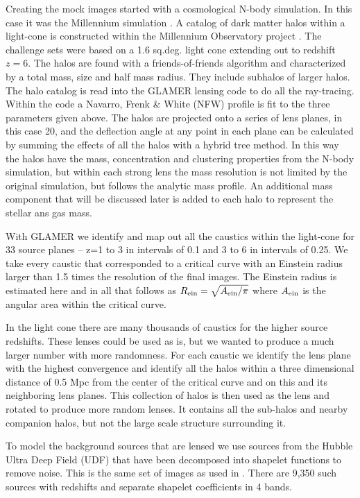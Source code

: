 \documentclass[useAMS,usenatbib]{mnras}
\begin{document}
Creating the mock images started with a cosmological N-body simulation.  In this case it was the Millennium simulation \citep{2009MNRAS.398.1150B}.   A catalog of dark matter halos within a light-cone is constructed within the Millennium Observatory project \citep{2013MNRAS.428..778O}.   The challenge sets were based on a 1.6 sq.deg. light cone extending out to redshift $z=6$.  The halos are found with a friends-of-friends algorithm and characterized by a total mass, size and half mass radius.  They include subhalos of larger halos.  The halo catalog is read into the GLAMER lensing code \citep{2014MNRAS.445.1942M,2014MNRAS.445.1954P} to do all the ray-tracing.    Within the code a Navarro, Frenk \& White (NFW) \citep{1996ApJ...462..563N} profile is fit to the three parameters given above.  The halos are projected onto a series of lens planes, in this case 20,  and the deflection angle at any point in each plane can be calculated by summing the effects of all the halos with a hybrid tree method.  In this way the halos have the mass, concentration and clustering properties from the N-body simulation, but within each strong lens the mass resolution is not limited by the original simulation, but follows the analytic mass profile.   An additional mass component that will be discussed later is added to each halo to represent the stellar ans gas mass.

With GLAMER we identify and map out all the caustics within the light-cone for 33 source planes -- z=1 to 3 in intervals of 0.1 and 3 to 6 in intervals of 0.25.  We take every caustic that corresponded to a critical curve with an Einstein radius larger than 1.5 times the resolution of the final images.  The Einstein radius is estimated here and in all that follows as $R_{\rm ein}=\sqrt{A_{\rm ein}/\pi}$ where $A_{\rm ein}$ is the angular area within the critical curve.

 In the light cone there are many thousands of caustics for the higher source redshifts.  These lenses could be used as is, but we wanted to produce a much larger number with more randomness.   For each caustic we identify the lens plane with the highest convergence and identify all the halos within a three dimensional distance of 0.5 Mpc from the center of the critical curve and on this and its neighboring lens planes.    This collection of halos is then used as the lens and rotated to produce more random lenses.    It  contains all the sub-halos and nearby companion halos, but not the large scale structure surrounding it.

To model the background sources that are lensed we use sources from the Hubble Ultra Deep Field (UDF) that have been decomposed into shapelet functions to remove noise.  This is the same set of images as used in \citet{2008A&A...482..403M,2010A&A...514A..93M,2016arXiv160604548M}.   There are 9,350 such sources with redshifts and separate shapelet coefficients in 4 bands.   
\end{document}
